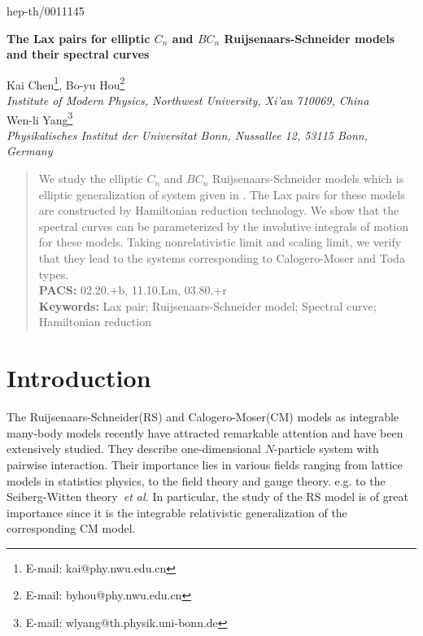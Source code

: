 \documentclass[a4paper,12pt]{article}
\begin{document}
\hfill\vbox{\hbox{hep-th/0011145}}

\begin{center}
{\Large	  \bf  The Lax pairs for elliptic $C_{n}$ and $BC_{n}$
Ruijsenaars-Schneider models \\and their spectral curves}
\end{center}

\begin{center}
Kai Chen\footnote{E-mail: kai@phy.nwu.edu.cn},
Bo-yu Hou\footnote{E-mail: byhou@phy.nwu.edu.cn}\\
{\small \it Institute of Modern Physics, Northwest University, Xi'an
710069, China}\\
Wen-li Yang\footnote{E-mail: wlyang@th.physik.uni-bonn.de}\\
{\small{\it  Physikalisches Institut der Universitat Bonn, Nussallee
12, 53115 Bonn, Germany }}
\end{center}


\begin{abstract}
We study the elliptic $C_{n}$ and $BC_{n}$
Ruijsenaars-Schneider models which is elliptic
generalization of system given in \cite{Che00}. The Lax
pairs for these models are constructed by Hamiltonian
reduction technology. We show that the spectral curves can
be parameterized by the involutive integrals of	 motion for these
models. Taking nonrelativistic limit and scaling limit, we
verify that they lead to the systems corresponding to
Calogero-Moser and Toda types.
\newline\\
{\bf \noindent PACS:} 02.20.+b, 11.10.Lm, 03.80.+r\\
{\bf \noindent Keywords:} Lax pair; Ruijsenaars-Schneider
model; Spectral curve; Hamiltonian reduction\\
\end{abstract}

\section{Introduction}

\setcounter{equation}{0} The Ruijsenaars-Schneider(RS) and
Calogero-Moser(CM) models as integrable many-body models
recently have attracted remarkable attention and have been
extensively studied. They describe one-dimensional
$N$-particle system with pairwise interaction. Their
importance lies in various fields ranging from lattice
models in statistics physics\cite{h1,nksr}, to the field
theory and gauge theory\cite {gm,n}. e.g. to the
Seiberg-Witten theory\cite{bm1}\textit{\ et al.} In particular,
the study of the RS model is of great importance since it is
the integrable relativistic generalization of the corresponding
CM model\cite{r1,r2}.
\end{document}
